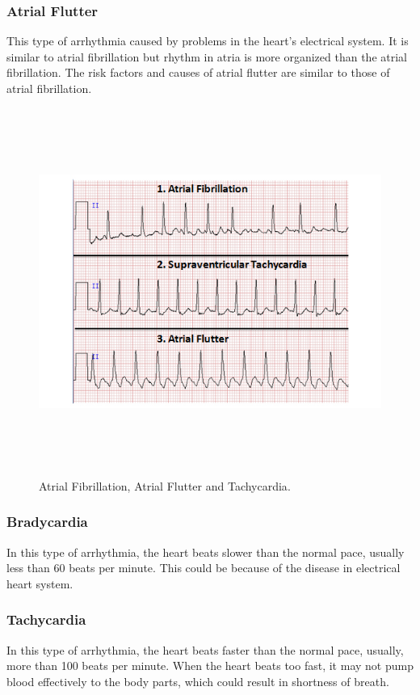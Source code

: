 \subsubsection{Atrial Flutter}
This type of arrhythmia caused by problems in the heart's electrical system. It is similar to atrial fibrillation but rhythm in atria is more organized than the atrial fibrillation. The risk factors and causes of atrial flutter are similar to those of atrial fibrillation.

\begin{figure}[htpb]
	\centering
	\includegraphics[width=15cm,height=12cm,keepaspectratio=true]{images/af}
	\caption{
		Atrial Fibrillation, Atrial Flutter and Tachycardia\cite{sumdu}.
	}
	\label{fig:af}
\end{figure}


\subsubsection{Bradycardia}
In this type of arrhythmia, the heart beats slower than the normal pace, usually less than 60 beats per minute. This could be because of the disease in electrical heart system.

\subsubsection{Tachycardia}
In this type of arrhythmia, the heart beats faster than the normal pace, usually, more than 100 beats per minute. When the heart beats too fast, it may not pump blood effectively to the body parts, which could result in shortness of breath.

